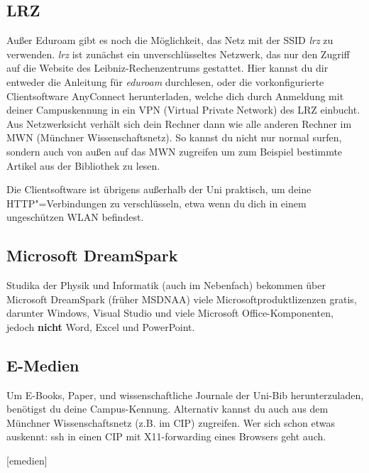 \subsection*{LRZ}
Außer Eduroam gibt es noch die Möglichkeit, das Netz mit der SSID
\emph{lrz} zu verwenden. \emph{lrz} ist zunächst ein unverschlüsseltes
Netzwerk, das nur den Zugriff auf die Website des
Leibniz-Rechen\-zentrums gestattet. Hier kannst du dir entweder die 
Anleitung für \mbox{\emph{eduroam}} durchlesen, oder die
vorkonfigurierte Clientsoftware AnyConnect herunterladen, welche dich
durch Anmeldung mit deiner Campuskennung in ein VPN (Virtual Private
Network) des LRZ einbucht. Aus Netzwerksicht verhält sich dein Rechner
dann wie alle anderen Rechner im MWN (Münchner Wissenschaftsnetz). So
kannst du nicht nur normal surfen, sondern auch von außen auf das
MWN zugreifen um zum Beispiel bestimmte Artikel aus der Bibliothek zu lesen.

Die Clientsoftware ist übrigens außerhalb der Uni praktisch, um deine
HTTP"=Verbindungen zu verschlüsseln, etwa wenn du dich in einem
ungeschützen WLAN befindest.

\subsection*{Microsoft DreamSpark \subjectList{\subjectI{}\subjectMI{}\subjectP{}}}
Studika der Physik und Informatik (auch im Nebenfach) bekommen über
Microsoft DreamSpark (früher MSDNAA) viele Microsoftproduktlizenzen
gratis, darunter Windows, Visual Studio und viele
Microsoft Office-Komponenten, jedoch \textbf{nicht} Word, Excel und PowerPoint.

\begin{urlList}
\end{urlList}

\subsection*{E-Medien}
Um E-Books, Paper, und wissenschaftliche Journale der Uni-Bib herunterzuladen,
benötigst du deine Campus-Kennung. Alternativ kannst du auch aus dem Münchner
Wissenschaftsnetz (z.B. im CIP) zugreifen. Wer sich schon etwas auskennt: ssh
in einen CIP mit X11-forwarding eines Browsers geht auch.
\begin{urlList}
	[emedien]
\end{urlList}
